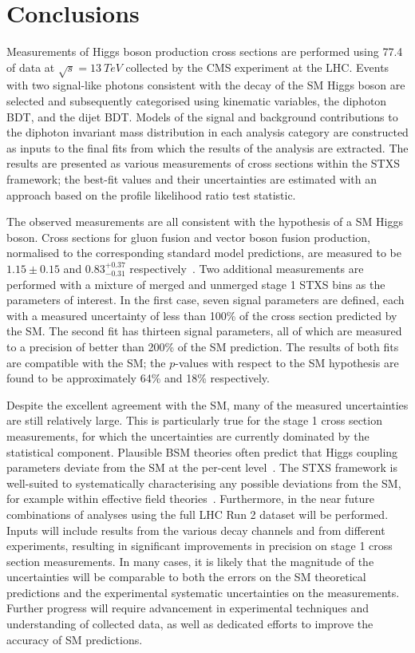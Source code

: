 \chapter{Conclusions}
\label{chap:conclusions}

Measurements of Higgs boson production cross sections are performed using \SI{77.4}{\fbinv} of 
data at $\sqrt{s} = \SI{13}{TeV}$ collected by the CMS experiment at the LHC.
Events with two signal-like photons consistent with the decay of the SM Higgs boson are selected
and subsequently categorised using kinematic variables, the diphoton BDT, and the dijet BDT.
Models of the signal and background contributions to the diphoton invariant mass distribution 
in each analysis category are constructed as inputs to the final fits
from which the results of the analysis are extracted.
The results are presented as various measurements of cross sections within the STXS framework;
the best-fit values and their uncertainties are estimated with an approach 
based on the profile likelihood ratio test statistic.

The observed measurements are all consistent with the hypothesis of a SM Higgs boson.
Cross sections for gluon fusion and vector boson fusion production, 
normalised to the corresponding standard model predictions,
are measured to be $1.15 \pm 0.15$ and $0.83_{-0.31}^{+0.37}$ respectively~\cite{HIG-18-029}.
Two additional measurements are performed with a mixture of merged and unmerged 
stage 1 STXS bins as the parameters of interest.
In the first case, seven signal parameters are defined, 
each with a measured uncertainty of less than 100\% of the cross section predicted by the SM.
The second fit has thirteen signal parameters, all of which are measured to a precision 
of better than 200\% of the SM prediction.
The results of both fits are compatible with the SM; the $p$-values with respect to the SM hypothesis
are found to be approximately 64\% and 18\% respectively.

Despite the excellent agreement with the SM, 
many of the measured uncertainties are still relatively large.
This is particularly true for the stage 1 cross section measurements, 
for which the uncertainties are currently dominated by the statistical component.
Plausible BSM theories often predict that Higgs coupling parameters 
deviate from the SM at the per-cent level~\cite{Snowmass}.
The STXS framework is well-suited to systematically characterising 
any possible deviations from the SM, for example within effective field theories~\cite{STXStoEFT}.
Furthermore, 
in the near future combinations of analyses using the full LHC Run 2 dataset will be performed.
Inputs will include results from the various decay channels and from different experiments, 
resulting in significant improvements in precision on stage 1 cross section measurements.
In many cases, it is likely that the magnitude of the uncertainties will be comparable to both 
the errors on the SM theoretical predictions 
and the experimental systematic uncertainties on the measurements.
Further progress will require advancement in experimental techniques 
and understanding of collected data, 
as well as dedicated efforts to improve the accuracy of SM predictions.


